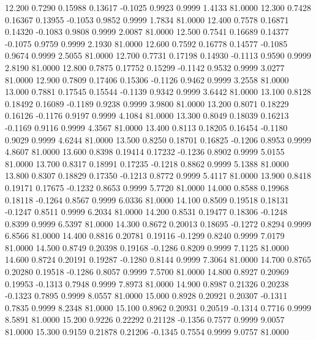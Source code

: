   12.200   0.7290   0.15988   0.13617  -0.1025   0.9923   0.9999   1.4133  81.0000
  12.300   0.7428   0.16367   0.13955  -0.1053   0.9852   0.9999   1.7834  81.0000
  12.400   0.7578   0.16871   0.14320  -0.1083   0.9808   0.9999   2.0087  81.0000
  12.500   0.7541   0.16689   0.14377  -0.1075   0.9759   0.9999   2.1930  81.0000
  12.600   0.7592   0.16778   0.14577  -0.1085   0.9674   0.9999   2.5055  81.0000
  12.700   0.7731   0.17198   0.14930  -0.1113   0.9590   0.9999   2.8190  81.0000
  12.800   0.7875   0.17752   0.15299  -0.1142   0.9532   0.9999   3.0277  81.0000
  12.900   0.7809   0.17406   0.15306  -0.1126   0.9462   0.9999   3.2558  81.0000
  13.000   0.7881   0.17545   0.15544  -0.1139   0.9342   0.9999   3.6442  81.0000
  13.100   0.8128   0.18492   0.16089  -0.1189   0.9238   0.9999   3.9800  81.0000
  13.200   0.8071   0.18229   0.16126  -0.1176   0.9197   0.9999   4.1084  81.0000
  13.300   0.8049   0.18039   0.16213  -0.1169   0.9116   0.9999   4.3567  81.0000
  13.400   0.8113   0.18205   0.16454  -0.1180   0.9029   0.9999   4.6244  81.0000
  13.500   0.8250   0.18701   0.16825  -0.1206   0.8953   0.9999   4.8607  81.0000
  13.600   0.8398   0.19414   0.17232  -0.1236   0.8902   0.9999   5.0155  81.0000
  13.700   0.8317   0.18991   0.17235  -0.1218   0.8862   0.9999   5.1388  81.0000
  13.800   0.8307   0.18829   0.17350  -0.1213   0.8772   0.9999   5.4117  81.0000
  13.900   0.8418   0.19171   0.17675  -0.1232   0.8653   0.9999   5.7720  81.0000
  14.000   0.8588   0.19968   0.18118  -0.1264   0.8567   0.9999   6.0336  81.0000
  14.100   0.8509   0.19518   0.18131  -0.1247   0.8511   0.9999   6.2034  81.0000
  14.200   0.8531   0.19477   0.18306  -0.1248   0.8399   0.9999   6.5397  81.0000
  14.300   0.8672   0.20013   0.18695  -0.1272   0.8294   0.9999   6.8566  81.0000
  14.400   0.8816   0.20781   0.19116  -0.1299   0.8240   0.9999   7.0179  81.0000
  14.500   0.8749   0.20398   0.19168  -0.1286   0.8209   0.9999   7.1125  81.0000
  14.600   0.8724   0.20191   0.19287  -0.1280   0.8144   0.9999   7.3064  81.0000
  14.700   0.8765   0.20280   0.19518  -0.1286   0.8057   0.9999   7.5700  81.0000
  14.800   0.8927   0.20969   0.19953  -0.1313   0.7948   0.9999   7.8973  81.0000
  14.900   0.8987   0.21326   0.20238  -0.1323   0.7895   0.9999   8.0557  81.0000
  15.000   0.8928   0.20921   0.20307  -0.1311   0.7835   0.9999   8.2348  81.0000
  15.100   0.8962   0.20931   0.20519  -0.1314   0.7716   0.9999   8.5891  81.0000
  15.200   0.9226   0.22292   0.21128  -0.1356   0.7577   0.9999   9.0057  81.0000
  15.300   0.9159   0.21878   0.21206  -0.1345   0.7554   0.9999   9.0757  81.0000
